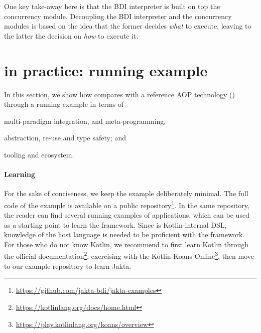 One key take-away here is that the \ac{BDI} interpreter is built on top the concurrency module.
%
Decoupling the BDI interpreter and the concurrency modules is based on the idea that the
former decides \emph{what} to execute,
leaving to the latter the decision on \emph{how} to execute it.
%

\section{\jakta{} in practice: running example}
\label{sec:running-example}

In this section, we show how \jakta{} compares with a reference AOP technology
(\jason{})
through a running example in terms of
%
\begin{inlinelist}
    \item multi-paradigm integration, and meta-programming,
    \item abstraction, re-use and type safety; and
    \item tooling and ecosystem.
\end{inlinelist}

\paragraph{Learning \jakta{}}

For the sake of conciseness,
we keep the example deliberately minimal.
%
%
The full code of the example is available on a public repository\footnote{
    \url{https://github.com/jakta-bdi/jakta-examples}
}.
%
In the same repository,
the reader can find several running examples of \jakta{} applications,
which can be used as a starting point to learn the framework.
%
Since \jakta{} is Kotlin-internal \ac{DSL},
knowledge of the host language is needed to be proficient with the framework.
%
For those who do not know Kotlin, we recommend to first learn Kotlin through the official documentation\footnote{
    \url{https://kotlinlang.org/docs/home.html}
},
exercising with the Kotlin Koans Online\footnote{
    \url{https://play.kotlinlang.org/koans/overview}
}, then move to our example repository to learn Jakta.


